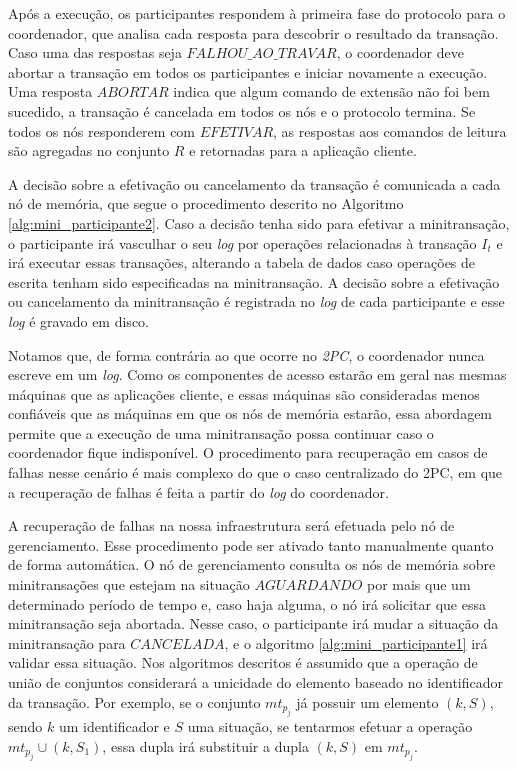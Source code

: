 \documentclass[11pt,twoside,a4paper]{book}
\begin{document}
 Após a execução, os participantes respondem à primeira fase do protocolo para o coordenador, que analisa cada resposta para descobrir o resultado da transação. Caso uma das respostas seja $FALHOU\_AO\_TRAVAR$, o coordenador deve abortar a transação em todos os participantes e iniciar novamente a execução. Uma resposta $ABORTAR$ indica que algum comando de extensão não foi bem sucedido, a transação é cancelada em todos os nós e o protocolo termina. Se todos os nós responderem com $EFETIVAR$, as respostas aos comandos de leitura são agregadas no conjunto $R$ e retornadas para a aplicação cliente. 

 A decisão sobre a efetivação ou cancelamento da transação é comunicada a cada nó de memória, que segue o procedimento descrito no Algoritmo \ref{alg:mini_participante2}. Caso a decisão tenha sido para efetivar a minitransação, o participante irá vasculhar o seu \emph{log} por operações relacionadas à transação $I_t$ e irá executar essas transações, alterando a tabela de dados caso operações de escrita tenham sido especificadas na minitransação. A decisão sobre a efetivação ou cancelamento da minitransação é registrada no \emph{log} de cada participante e esse \emph{log} é gravado em disco.

Notamos que, de forma contrária ao que ocorre no \emph{2PC}, o coordenador nunca escreve em um \emph{log}. Como os componentes de acesso estarão em geral nas mesmas máquinas que as aplicações cliente, e essas máquinas são consideradas menos confiáveis que as máquinas em que os nós de memória estarão, essa abordagem permite que a execução de uma minitransação possa continuar caso o coordenador fique indisponível. O procedimento para recuperação em casos de falhas nesse cenário é mais complexo do que o caso centralizado do 2PC, em que a recuperação de falhas é feita a partir do \emph{log} do coordenador.

A recuperação de falhas na nossa infraestrutura será efetuada pelo nó de gerenciamento. Esse procedimento pode ser ativado tanto manualmente quanto de forma automática. O nó de gerenciamento consulta os nós de memória sobre minitransações que estejam na situação $AGUARDANDO$ por mais que um determinado período de tempo e, caso haja alguma, o nó irá solicitar que essa minitransação seja abortada. Nesse caso, o participante irá mudar a situação da minitransação para $CANCELADA$, e o algoritmo \ref{alg:mini_participante1} irá validar essa situação. Nos algoritmos descritos é assumido que a operação de união de conjuntos considerará a unicidade do elemento baseado no identificador da transação. Por exemplo, se o conjunto $mt_{p_j}$ já possuir um elemento $(k, S)$, sendo $k$ um identificador e $S$ uma situação, se tentarmos efetuar a operação $mt_{p_j} \cup (k, S_1)$, essa dupla irá substituir a dupla $(k,S)$ em $mt_{p_j}$.
\end{document}
